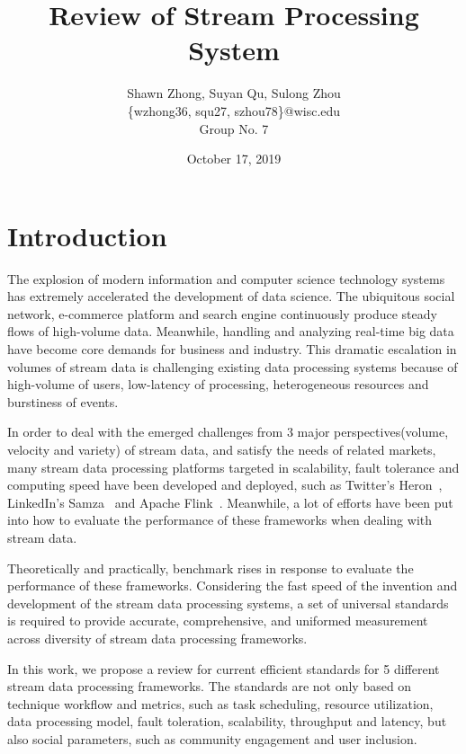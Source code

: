 \documentclass[pdftex,twocolumn,10pt,letterpaper]{article}
\begin{document}
\title{ Review of Stream Processing System }
\author{
    Shawn Zhong, Suyan Qu, Sulong Zhou \\
    \{wzhong36, squ27, szhou78\}@wisc.edu\\
    Group No. 7
}
\date{October 17, 2019}


\maketitle

\section{Introduction}

The explosion of modern information and computer science technology systems has extremely accelerated the development of data science. The ubiquitous social network, e-commerce platform and search engine continuously produce steady flows of high-volume data. Meanwhile, handling and analyzing real-time big data have become core demands for business and industry. This dramatic escalation in volumes of stream data is challenging existing data processing systems because of high-volume of users, low-latency of processing, heterogeneous resources and burstiness of events.  

In order to deal with the emerged challenges from 3 major perspectives(volume, velocity and variety) of stream data, and satisfy the needs of related markets, many stream data processing platforms targeted in scalability, fault tolerance and computing speed have been developed and deployed, such as Twitter’s Heron~\cite{Kulkarni:2015:THS:2723372.2742788}, LinkedIn’s Samza~\cite{Noghabi:2017:SSS:3137765.3137770} and Apache Flink~\cite{Carbone2015ApacheFS}. Meanwhile, a lot of efforts have been put into how to evaluate the performance of these frameworks when dealing with stream data. 

Theoretically and practically, benchmark rises in response to evaluate the performance of these frameworks. Considering the fast speed of the invention and development of the stream data processing systems, a set of universal standards is required to provide accurate, comprehensive, and uniformed measurement across diversity of stream data processing frameworks. 

In this work, we propose a review for current efficient standards for 5 different stream data processing frameworks. The standards are not only based on technique workflow and metrics, such as task scheduling, resource utilization, data processing model, fault toleration, scalability, throughput and latency, but also social parameters, such as community engagement and user inclusion.
\end{document}
